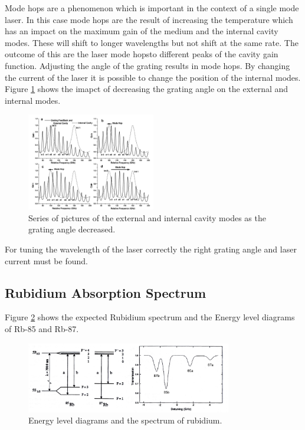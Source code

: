 Mode hops are a phenomenon which is important in the context of a single mode laser.
In this case mode hops are the result of increasing the temperature which has an impact on the maximum gain of the medium and the internal cavity modes. 
These will shift to longer wavelengths but not shift at the same rate. The outcome of this are the laser mode hopsto different peaks of the cavity gain function.
Adjusting the angle of the grating results in mode hops. By changing the current of the laser it is possible to change the position of the internal modes.
Figure \ref{fig:mode} shows the imapct of decreasing the grating angle on the external and internal modes.
\begin{figure}[H] 
    \centering
    \includegraphics[width=0.5\textwidth]{content/graphics/modehops.jpg}
    \caption{Series of pictures of the external and internal cavity modes as the grating angle decreased. \cite{diode_laser}} %
    \label{fig:mode} 
\end{figure}
For tuning the wavelength of the laser correctly the right grating angle and laser current must be found.

\subsection{Rubidium Absorption Spectrum}
\label{sec:Rubidium Absorption Spectrum}

Figure \ref{fig:Rb} shows the expected Rubidium spectrum and the Energy level diagrams of Rb-85 and Rb-87.
\begin{figure}[H]
    \centering
    \includegraphics[width=0.8\textwidth]{content/graphics/Rb.jpg}
    \caption{Energy level diagrams and the spectrum of rubidium. \cite{diode_laser}} %
    \label{fig:Rb} 
\end{figure}
